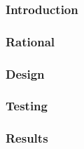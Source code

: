 \subsubsection{Introduction}

\subsubsection{Rational}

\subsubsection{Design}

\subsubsection{Testing}

\subsubsection{Results}
